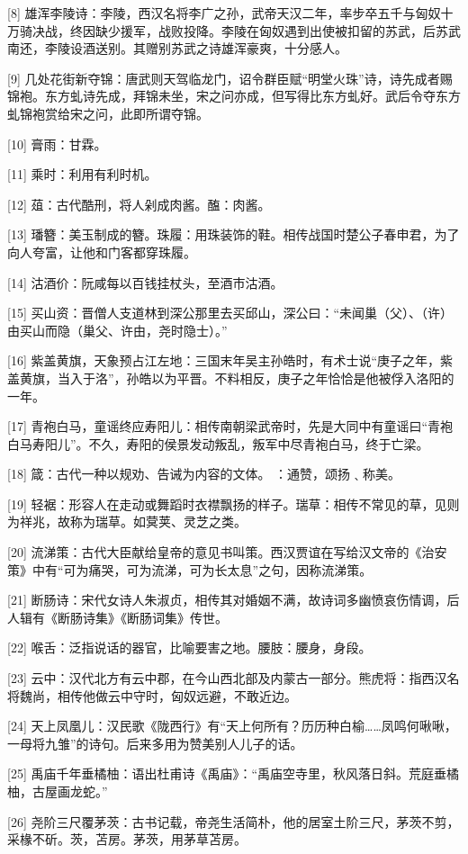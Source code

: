 \documentclass[12pt,UTF8]{ctexbook}
\begin{document}
[8] 雄浑李陵诗：李陵，西汉名将李广之孙，武帝天汉二年，率步卒五千与匈奴十万骑决战，终因缺少援军，战败投降。李陵在匈奴遇到出使被扣留的苏武，后苏武南还，李陵设酒送别。其赠别苏武之诗雄浑豪爽，十分感人。

[9] 几处花街新夺锦：唐武则天驾临龙门，诏令群臣赋“明堂火珠”诗，诗先成者赐锦袍。东方虬诗先成，拜锦未坐，宋之问亦成，但写得比东方虬好。武后令夺东方虬锦袍赏给宋之问，此即所谓夺锦。

[10] 膏雨：甘霖。

[11] 乘时：利用有利时机。

[12] 葅：古代酷刑，将人剁成肉酱。醢：肉酱。

[13] 璠簪：美玉制成的簪。珠履：用珠装饰的鞋。相传战国时楚公子春申君，为了向人夸富，让他和门客都穿珠履。

[14] 沽酒价：阮咸每以百钱挂杖头，至酒市沽酒。

[15] 买山资：晋僧人支道林到深公那里去买邱山，深公曰：“未闻巢（父）、（许）由买山而隐（巢父、许由，尧时隐士）。”

[16] 紫盖黄旗，天象预占江左地：三国末年吴主孙皓时，有术士说“庚子之年，紫盖黄旗，当入于洛”，孙皓以为平晋。不料相反，庚子之年恰恰是他被俘入洛阳的一年。

[17] 青袍白马，童谣终应寿阳儿：相传南朝梁武帝时，先是大同中有童谣曰“青袍白马寿阳儿”。不久，寿阳的侯景发动叛乱，叛军中尽青袍白马，终于亡梁。

[18] 箴：古代一种以规劝、告诫为内容的文体。 ：通赞，颂扬﹑称美。

[19] 轻裾：形容人在走动或舞蹈时衣襟飘扬的样子。瑞草：相传不常见的草，见则为祥兆，故称为瑞草。如蓂荚、灵芝之类。

[20] 流涕策：古代大臣献给皇帝的意见书叫策。西汉贾谊在写给汉文帝的《治安策》中有“可为痛哭，可为流涕，可为长太息”之句，因称流涕策。

[21] 断肠诗：宋代女诗人朱淑贞，相传其对婚姻不满，故诗词多幽愤哀伤情调，后人辑有《断肠诗集》《断肠词集》传世。

[22] 喉舌：泛指说话的器官，比喻要害之地。腰肢：腰身，身段。

[23] 云中：汉代北方有云中郡，在今山西北部及内蒙古一部分。熊虎将：指西汉名将魏尚，相传他做云中守时，匈奴远避，不敢近边。

[24] 天上凤凰儿：汉民歌《陇西行》有“天上何所有？历历种白榆……凤鸣何啾啾，一母将九雏”的诗句。后来多用为赞美别人儿子的话。

[25] 禹庙千年垂橘柚：语出杜甫诗《禹庙》：“禹庙空寺里，秋风落日斜。荒庭垂橘柚，古屋画龙蛇。”

[26] 尧阶三尺覆茅茨：古书记载，帝尧生活简朴，他的居室土阶三尺，茅茨不剪，采椽不斫。茨，苫房。茅茨，用茅草苫房。
\end{document}
